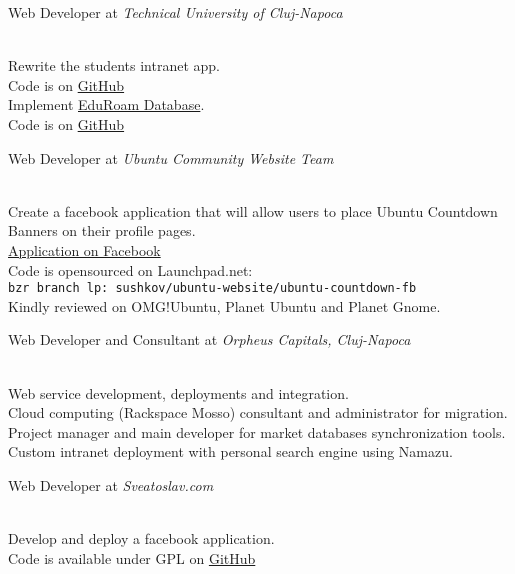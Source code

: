 \documentclass[10pt, a4paper]{article}
\newcommand{\years}[1]{\marginnote{\scriptsize #1}}
\begin{document}
\years{2009-2010}Web Developer at \emph{Technical University of Cluj-Napoca}
\begin{footnotesize}
\\
Rewrite the students intranet app.\\
Code is on \href{http://github.com/stas/student.utcluj.ro}{GitHub}\\
Implement \href{http://monitor.eduroam.org/database.php}{EduRoam Database}.\\
Code is on \href{http://github.com/stas/eduroam-db}{GitHub}
\end{footnotesize}

\years{2010}Web Developer at \emph{Ubuntu Community Website Team}
\begin{footnotesize}
\\
Create a facebook application that will allow users to place Ubuntu Countdown Banners on their profile pages.\\
\href{http://www.facebook.com/apps/application.php?id=115718008445537}{Application on Facebook}\\
Code is opensourced on Launchpad.net:\\
\texttt{bzr branch lp:~sushkov/ubuntu-website/ubuntu-countdown-fb}\\
Kindly reviewed on OMG!Ubuntu, Planet Ubuntu and Planet Gnome.
\end{footnotesize}

\years{2009}Web Developer and Consultant at \emph{Orpheus Capitals, Cluj-Napoca}
\begin{footnotesize}
\\
Web service development, deployments and integration.\\
Cloud computing (Rackspace Mosso) consultant and administrator for migration.\\
Project manager and main developer for market databases synchronization tools.\\
Custom intranet deployment with personal search engine using Namazu.
\end{footnotesize}

\years{2009}Web Developer at \emph{Sveatoslav.com}
\begin{footnotesize}
\\
Develop and deploy a facebook application.\\
Code is available under GPL on \href{http://github.com/stas/facebook-ideas-app}{GitHub}
\end{footnotesize}
\end{document}
